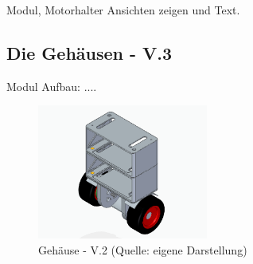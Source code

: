 Modul, Motorhalter Ansichten zeigen und Text.


\subsection{Die Gehäusen - V.3}

Modul Aufbau: ....


\begin{figure}[!h]  %
	\centering\includegraphics[width=0.5\textwidth]{images/gehaeuse-v3.png}
	\caption{Gehäuse - V.2 \newline (Quelle: eigene Darstellung)}
	\label{gehaeuse-v3} %
\end{figure}



